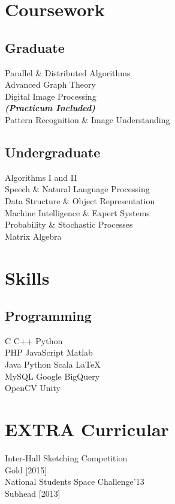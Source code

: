 \documentclass[]{deedy-resume-openfont}
\begin{document}
\begin{minipage}[t]{0.33\textwidth}

\section{Coursework}
\subsection{Graduate}
Parallel \& Distributed Algorithms\\
Advanced Graph Theory\\
Digital Image Processing\\
{\footnotesize \textit{\textbf{(Practicum Included) }}} \\
Pattern Recognition \& Image Understanding\\
\sectionsep

\subsection{Undergraduate}
Algorithms I and II\\
Speech \& Natural Language Processing\\
Data Structure \& Object Representation\\
Machine Intelligence \& Expert Systems\\
Probability \& Stochastic Processes\\
Matrix Algebra\\
\sectionsep


\section{Skills}
\subsection{Programming}
C \textbullet{} C++ \textbullet{} Python \\
PHP \textbullet{} JavaScript \textbullet{} Matlab \\
Java \textbullet{} Python \textbullet{} Scala \textbullet{} \LaTeX\ \\
MySQL \textbullet{} Google BigQuery \\
OpenCV \textbullet{} Unity
\sectionsep

\section{EXTRA Curricular} 
Inter-Hall Sketching Competition\\
Gold [2015] \\
National Students Space Challenge'13\\
Subhead [2013]


 
%
%

\end{minipage} 
\end{document}
